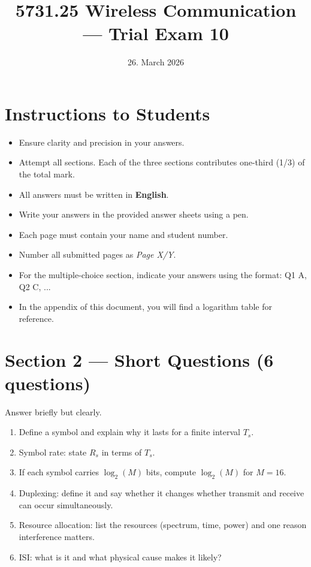 \documentclass[11pt,a4paper]{article}
\begin{document}
\pagestyle{fancy}
\fancyhf{}
\renewcommand{\headrulewidth}{0pt}
\renewcommand{\footrulewidth}{0pt}
\fancyfoot[R]{\thepage/\pageref{LastPage}}
\fancypagestyle{plain}{
    \fancyhf{}
    \fancyfoot[R]{\thepage/\pageref{LastPage}}
    \renewcommand{\headrulewidth}{0pt}
    \renewcommand{\footrulewidth}{0pt}
}

\title{5731.25 Wireless Communication --- Trial Exam 10}
\date{26. March 2026}
\maketitle

\section*{Instructions to Students}
\begin{itemize}
    \item Ensure clarity and precision in your answers.
    \item Attempt all sections. Each of the three sections contributes one-third (1/3) of the total mark.
    \item All answers must be written in \textbf{English}.
    \item Write your answers in the provided answer sheets using a pen.
    \item Each page must contain your name and student number.
    \item Number all submitted pages as \textit{Page X/Y}.
    \item For the multiple-choice section, indicate your answers using the format: Q1 A, Q2 C, ...
    \item In the appendix of this document, you will find a logarithm table for reference.
\end{itemize}

\newpage

\newpage

\section*{Section 2 --- Short Questions (6 questions)}
Answer briefly but clearly.

\begin{enumerate}[leftmargin=0.9cm]
\item Define a symbol and explain why it lasts for a finite interval $T_s$.

\item Symbol rate: state $R_s$ in terms of $T_s$.

\item If each symbol carries $\log_2(M)$ bits, compute $\log_2(M)$ for $M=16$.

\item Duplexing: define it and say whether it changes whether transmit and receive can occur simultaneously.

\item Resource allocation: list the resources (spectrum, time, power) and one reason interference matters.

\item ISI: what is it and what physical cause makes it likely?
\end{enumerate}
\end{document}
